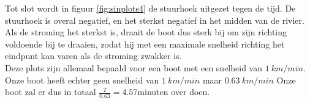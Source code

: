 Tot slot wordt in figuur \ref{fig:sinplots4} de stuurhoek uitgezet tegen de tijd.
De stuurhoek is overal negatief, en het sterkst negatief in het midden van de rivier.
Als de stroming het sterkst is, draait de boot dus sterk bij om zijn richting voldoende bij te draaien, zodat hij met een maximale snelheid richting het eindpunt kan varen als de stroming zwakker is.\\

Deze plots zijn allemaal bepaald voor een boot met een snelheid van \(1~km/min\).
Onze boot heeft echter geen snelheid van \(1~km/min\) maar \(0.63~km/min\) Onze boot zal er dus in totaal \(\frac{T}{0.63}=4.57\)minuten over doen.
